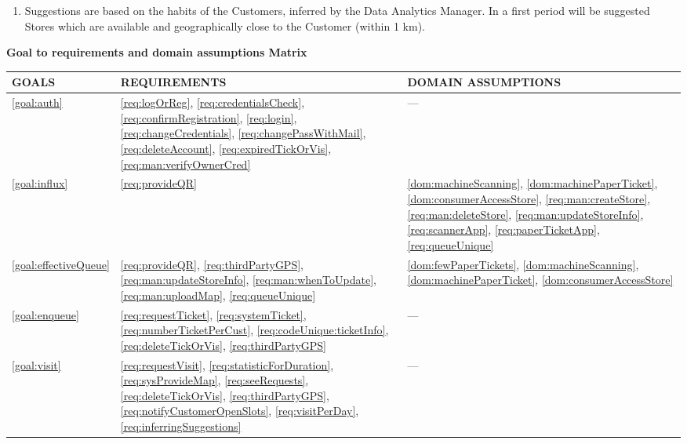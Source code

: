 \documentclass[a4paper, 10pt, oneside]{article}
\begin{document}
\begin{enumerate}[align=left, label={R.\arabic{*}}]
    \item \label{req:inferringSuggestions}Suggestions are based on the habits of the Customers, inferred by the Data Analytics Manager. In a first period will be suggested Stores which are available and geographically close to the Customer (within 1 km). 
\end{enumerate}

\label{uc:gToReDMatrix}
\begin{center}
{\textbf{Goal to requirements and domain assumptions Matrix}}
\end{center}

\begin{tabularx}{\linewidth}{| p{20mm} | p{50mm} | p{50mm} |}

     \hline
	GOALS & REQUIREMENTS & DOMAIN ASSUMPTIONS \\
	\hline 
	\ref{goal:auth} & \ref{req:logOrReg}, \ref{req:credentialsCheck}, \ref{req:confirmRegistration}, \ref{req:login}, \ref{req:changeCredentials}, \ref{req:changePassWithMail}, \ref{req:deleteAccount}, \ref{req:expiredTickOrVis}, \ref{req:man:verifyOwnerCred} & --- \\
	
	\hline
	\ref{goal:influx} & \ref{req:provideQR} & \ref{dom:machineScanning}, \ref{dom:machinePaperTicket}, \ref{dom:consumerAccessStore}, \ref{req:man:createStore}, \ref{req:man:deleteStore}, \ref{req:man:updateStoreInfo}, \ref{req:scannerApp}, \ref{req:paperTicketApp}, \ref{req:queueUnique} \\
	
	 \hline 
	\ref{goal:effectiveQueue} & \ref{req:provideQR}, \ref{req:thirdPartyGPS}, \ref{req:man:updateStoreInfo}, \ref{req:man:whenToUpdate}, \ref{req:man:uploadMap}, \ref{req:queueUnique} & \ref{dom:fewPaperTickets}, \ref{dom:machineScanning}, \ref{dom:machinePaperTicket}, \ref{dom:consumerAccessStore} \\
	
	\hline
	\ref{goal:enqueue} & \ref{req:requestTicket}, \ref{req:systemTicket}, \ref{req:numberTicketPerCust}, \ref{req:codeUnique:ticketInfo}, \ref{req:deleteTickOrVis}, \ref{req:thirdPartyGPS} & ---  \\

	\hline
	
	\ref{goal:visit} & \ref{req:requestVisit}, \ref{req:statisticForDuration}, \ref{req:sysProvideMap}, \ref{req:seeRequests}, \ref{req:deleteTickOrVis}, \ref{req:thirdPartyGPS}, \ref{req:notifyCustomerOpenSlots}, \ref{req:visitPerDay}, \ref{req:inferringSuggestions}  & ---  \\

	\hline
	
\end{tabularx}
\end{document}
